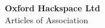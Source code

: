 

\begin{titlepage}
\begin{center}
{\bf \LARGE Oxford Hackspace Ltd}\\[36pt]
{\Large Articles of Association}

\vfill

\end{center}
\end{titlepage}


